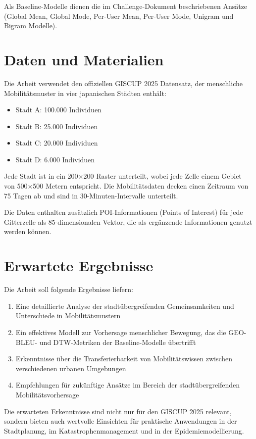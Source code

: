 \documentclass[a4paper,12pt]{article}
\begin{document}
Als Baseline-Modelle dienen die im Challenge-Dokument beschriebenen Ansätze (Global Mean, Global Mode, Per-User Mean, Per-User Mode, Unigram und Bigram Modelle).

\section{Daten und Materialien}

Die Arbeit verwendet den offiziellen GISCUP 2025 Datensatz, der menschliche Mobilitätsmuster in vier japanischen Städten enthält:
\begin{itemize}
    \item Stadt A: 100.000 Individuen
    \item Stadt B: 25.000 Individuen
    \item Stadt C: 20.000 Individuen
    \item Stadt D: 6.000 Individuen
\end{itemize}

Jede Stadt ist in ein 200×200 Raster unterteilt, wobei jede Zelle einem Gebiet von 500×500 Metern entspricht. Die Mobilitätsdaten decken einen Zeitraum von 75 Tagen ab und sind in 30-Minuten-Intervalle unterteilt.

Die Daten enthalten zusätzlich POI-Informationen (Points of Interest) für jede Gitterzelle als 85-dimensionalen Vektor, die als ergänzende Informationen genutzt werden können.

\section{Erwartete Ergebnisse}

Die Arbeit soll folgende Ergebnisse liefern:
\begin{enumerate}
    \item Eine detaillierte Analyse der stadtübergreifenden Gemeinsamkeiten und Unterschiede in Mobilitätsmustern
    \item Ein effektives Modell zur Vorhersage menschlicher Bewegung, das die GEO-BLEU- und DTW-Metriken der Baseline-Modelle übertrifft
    \item Erkenntnisse über die Transferierbarkeit von Mobilitätswissen zwischen verschiedenen urbanen Umgebungen
    \item Empfehlungen für zukünftige Ansätze im Bereich der stadtübergreifenden Mobilitätsvorhersage
\end{enumerate}

Die erwarteten Erkenntnisse sind nicht nur für den GISCUP 2025 relevant, sondern bieten auch wertvolle Einsichten für praktische Anwendungen in der Stadtplanung, im Katastrophenmanagement und in der Epidemiemodellierung.
\end{document}
